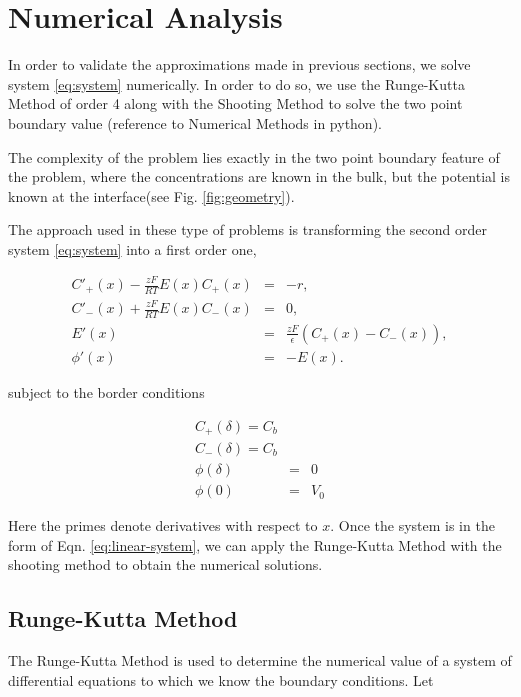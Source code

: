 


\section{Numerical Analysis}

In order to validate the approximations made in previous sections, we solve system \ref{eq:system} numerically. In order to do so, we use the Runge-Kutta Method of order 4 along with the  Shooting Method to solve the two point boundary value (reference to Numerical Methods in python).  



The complexity of the problem lies exactly in the two point boundary feature of the problem, where the concentrations are known in the bulk, but the potential is known at the interface(see Fig. \ref{fig:geometry}). 

The approach used in these type of problems is transforming the second order system \ref{eq:system} into a first order one,

\begin{eqnarray}
C'_+(x)-\frac{zF}{RT}E(x)C_+(x) &=& -r, \\
C'_-(x)+\frac{zF}{RT}E(x)C_-(x) &=& 0, \\
E'(x) &=& \frac{zF}{\epsilon}(C_+(x)-C_-(x)), \\
\phi'(x) &=& -E(x).
\label{eq:linear-system}
\end{eqnarray}

subject to the border conditions

\begin{eqnarray}
C_+(\delta) = C_b  \\
C_-(\delta) = C_b \\
\phi(\delta) &=& 0\\
\phi(0) &=&  V_0
\label{eq:linear-system}
\end{eqnarray}

Here the primes denote derivatives with respect to $x$. Once the system is in the form of Eqn. \ref{eq:linear-system}, we can apply the Runge-Kutta Method with the shooting method to obtain the numerical solutions. 

\subsection{Runge-Kutta Method}
\label{sec:run_kut}

The Runge-Kutta Method is used to determine the numerical value of a system of differential equations to which we know the boundary conditions. Let 

